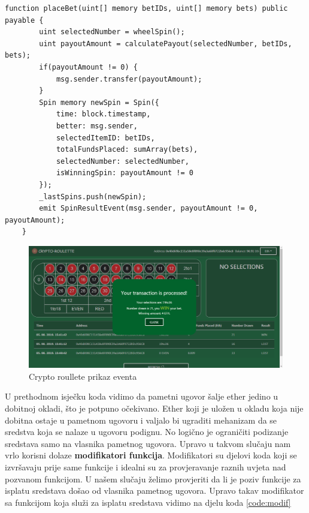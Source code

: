 \documentclass[a4paper,oneside,12pt]{memoir} %
\begin{document}
\begin{lstlisting}[caption=Funkcija koja se pokreće prilikom slanja transakcije koja sadrži podatke za igru jedne runde ruleta. Argumenti funkcije su polje \lstinline{betIDs} sa okladama i polje \lstinline{bets} sa iznosima za okladu. Na početku vidimo generaciju broja i računanje dobitka. Tada pametni ugovor ako ima dobitka u liniji \lstinline{msg.sender.transfer(payoutAmount)} se šalje dobitak osobi koja je poslala transakciju. Sve prethodne oklade se čuvaju u polju (primjetimo da je to lošiji način zapravo\, jer nakon nekog vremena polje će zauzimati mnogo memorije\, pa će i cijena oklade biti skuplja.) U zadnjoj liniji se odašilje event koji se prikazuje na ekranu kao na slici \ref{fig:result}, label={code:bet}]
    function placeBet(uint[] memory betIDs, uint[] memory bets) public payable {
        uint selectedNumber = wheelSpin();
        uint payoutAmount = calculatePayout(selectedNumber, betIDs, bets);
        if(payoutAmount != 0) {
            msg.sender.transfer(payoutAmount);
        }
        Spin memory newSpin = Spin({
            time: block.timestamp,
            better: msg.sender,
            selectedItemID: betIDs,
            totalFundsPlaced: sumArray(bets),
            selectedNumber: selectedNumber,
            isWinningSpin: payoutAmount != 0
        });
        _lastSpins.push(newSpin);
        emit SpinResultEvent(msg.sender, payoutAmount != 0, payoutAmount);
    }
\end{lstlisting}

\begin{figure}[H]
\centering
\includegraphics[scale=0.44]{result}
\caption{Crypto roullete prikaz eventa}
\label{fig:result}
\end{figure}

U prethodnom isječku koda vidimo da pametni ugovor šalje ether jedino u dobitnoj okladi, što je potpuno očekivano. Ether koji je uložen u okladu koja nije dobitna ostaje u pametnom ugovoru i valjalo bi ugraditi mehanizam da se sredstva koja se nalaze u ugovoru podignu. No logično je ograničiti podizanje sredstava samo na vlasnika pametnog ugovora. Upravo u takvom slučaju nam vrlo korisni dolaze \textbf{modifikatori funkcija}. Modifikatori su djelovi koda koji se izvršavaju prije same funkcije i idealni su za provjeravanje raznih uvjeta nad pozvanom funkcijom. U našem slučaju želimo provjeriti da li je poziv funkcije za isplatu sredstava došao od vlasnika pametnog ugovora. Upravo takav modifikator sa funkcijom koja služi za isplatu sredstava vidimo na djelu koda \ref{code:modif}
\end{document}
